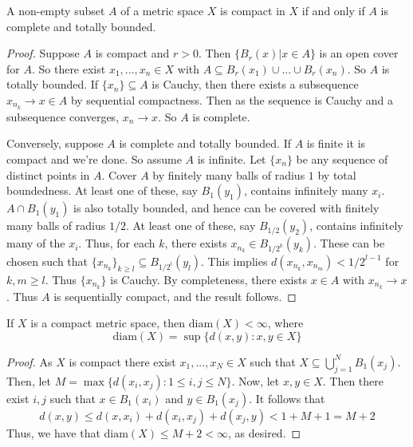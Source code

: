 \begin{thm}
    A non-empty subset $A$ of a metric space $X$ is compact in $X$ if and only if $A$ is complete and totally bounded.
\end{thm}
\begin{proof}
    Suppose $A$ is compact and $r>0$. Then $\{B_r(x)\vert x \in A\}$ is an open cover for $A$. So there exist $x_1,...,x_n \in X$ with $A \subseteq B_r(x_1)\cup ... \cup B_r(x_n)$. So $A$ is totally bounded. If $\{x_n\} \subseteq A$ is Cauchy, then there exists a subsequence $x_{n_k}\rightarrow x \in A$ by sequential compactness. Then as the sequence is Cauchy and a subsequence converges, $x_n\rightarrow x$. So $A$ is complete. 

    Conversely, suppose $A$ is complete and totally bounded. If $A$ is finite it is compact and we're done. So assume $A$ is infinite. Let $\{x_n\}$ be any sequence of distinct points in $A$. Cover $A$ by finitely many balls of radius $1$ by total boundedness. At least one of these, say $B_1(y_1)$, contains infinitely many $x_i$. $A \cap B_1(y_1)$ is also totally bounded, and hence can be covered with finitely many balls of radius $1/2$. At least one of these, say $B_{1/2}(y_2)$, contains infinitely many of the $x_i$. Thus, for each $k$, there exists $x_{n_k} \in B_{1/2^k}(y_k)$. These can be chosen such that $\{x_{n_k}\}_{k\geq l} \subseteq B_{1/2^l}(y_l)$. This implies $d(x_{n_k},x_{n_m}) < 1/2^{l-1}$ for $k,m \geq l$. Thus $\{x_{n_k}\}$ is Cauchy. By completeness, there exists $x \in A$ with $x_{n_k}\rightarrow x$. Thus $A$ is sequentially compact, and the result follows.
\end{proof}


\begin{prop}\label{prop:2.3.8}
    If $X$ is a compact metric space, then $\text{diam}(X) < \infty$, where \begin{equation*}
        \text{diam}(X) = \sup\{d(x,y):x,y \in X\}
    \end{equation*}
\end{prop}
\begin{proof}
     As $X$ is compact there exist $x_1,...,x_N \in X$ such that $X \subseteq \bigcup_{j=1}^NB_1(x_j)$. Then, let $M = \max\{d(x_i,x_j):1\leq i,j\leq N\}$. Now, let $x,y \in X$. Then there exist $i,j$ such that $x \in B_1(x_i)$ and $y \in B_1(x_j)$. It follows that $$d(x,y) \leq d(x,x_i) + d(x_i,x_j) + d(x_j,y) < 1+M+1 = M+2$$ Thus, we have that $\text{diam}(X) \leq M+2 < \infty$, as desired.
\end{proof}


